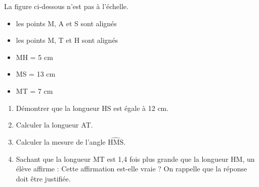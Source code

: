 \documentclass[exercice]{thedocument}%
\begin{document}
%
\small La figure ci-dessous n'est pas à l'échelle.
\begin{itemize}
    \item les points M, A et S sont alignés
    \item les points M, T et H sont alignés
    \item MH = 5 cm
    \item MS = 13 cm
    \item MT = 7 cm
\end{itemize}
\begin{enumerate}
    \item Démontrer que la longueur HS est égale à 12 cm.
    \item Calculer la longueur AT.
    \item Calculer la mesure de l'angle $\widehat{\text{HMS}}$.
    \item Sachant que la longueur MT est 1,4 fois plus grande que la longueur
    HM, un élève affirme : \vskip1pt
    Cette affirmation est-elle vraie ? On rappelle que la réponse doit être
    justifiée.
\end{enumerate}
\end{document}
